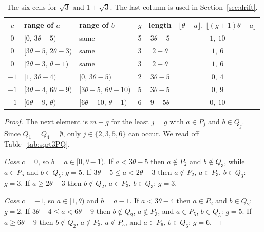 \documentclass[12pt]{article}
\newcommand{\fl}[1]{\lfloor #1 \rfloor}
\theoremstyle{plain}
\theoremstyle{remark}
\begin{document}
\begin{table}[ht]
\centering
\begin{tabular}{cllccc}
\toprule
$c$ & range of $a$ & range of $b$ & $g$ & length & $\fl{\theta-a},\ \fl{(g+1)\theta-a}$\\
\midrule
$0$ & $[0,\,3\theta-5)$ & same & 5 & $3\theta-5$ & $1,\ 10$\\
$0$ & $[3\theta-5,\,2\theta-3)$ & same & 3 & $2-\theta$ & $1,\ 6$\\
$0$ & $[2\theta-3,\,\theta-1)$ & same & 3 & $2-\theta$ & $1,\ 6$\\
$-1$ & $[1,\,3\theta-4)$ & $[0,\,3\theta-5)$ & 2 & $3\theta-5$ & $0,\ 4$\\
$-1$ & $[3\theta-4,\,6\theta-9)$ & $[3\theta-5,\,6\theta-10)$ & 5 & $3\theta-5$ & $0,\ 9$\\
$-1$ & $[6\theta-9,\,\theta)$ & $[6\theta-10,\,\theta-1)$ & 6 & $9-5\theta$ & $0,\ 10$\\
\bottomrule
\end{tabular}
\caption{The six cells for $\sqrt3$ and $1+\sqrt3$. The last column is used in
Section~\ref{sec:drift}.}\label{tab:sqrt3cells}
\end{table}

\begin{proof}
The next element is $m+g$ for the least $j=g$ with $a\in P_j$ and $b\in Q_j$. Since
$Q_1=Q_4=\emptyset$, only $j\in\{2,3,5,6\}$ can occur. We read off Table~\ref{tab:sqrt3PQ}.

\emph{Case $c=0$}, so $b=a\in[0,\theta-1)$. If $a<3\theta-5$ then $a\notin P_2$ and $b\notin Q_3$,
while $a\in P_5$ and $b\in Q_5$: $g=5$. If $3\theta-5\le a<2\theta-3$ then $a\notin P_2$,
$a\in P_3$, $b\in Q_3$: $g=3$. If $a\ge2\theta-3$ then $b\notin Q_2$, $a\in P_3$, $b\in Q_3$:
$g=3$.

\emph{Case $c=-1$}, so $a\in[1,\theta)$ and $b=a-1$. If $a<3\theta-4$ then $a\in P_2$ and
$b\in Q_2$: $g=2$. If $3\theta-4\le a<6\theta-9$ then $b\notin Q_2$, $a\notin P_3$, and
$a\in P_5$, $b\in Q_5$: $g=5$. If $a\ge6\theta-9$ then $b\notin Q_2$, $a\notin P_3$,
$a\notin P_5$, and $a\in P_6$, $b\in Q_6$: $g=6$.
\end{proof}
\end{document}
